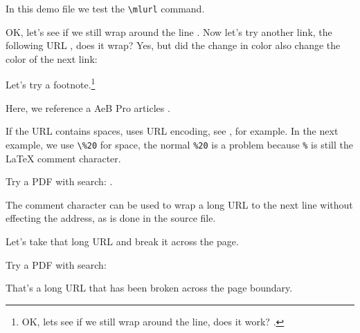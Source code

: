 \documentclass{article}
\begin{document}
In this demo file we test the \verb~\mlurl~ command.

OK, let's see if we still wrap around the line
. Now let's try another link, the following URL
, does it wrap? Yes,
but did the change in color also change the color of the next link: 

Let's try a footnote.\footnote{OK, lets see if we still wrap around the line, does it work?
.}

Here, we reference a \textsf{AeB Pro} articles .

If the URL contains spaces, uses URL encoding, see , for example.
In the next example, we use \verb~\%20~ for space, the normal \texttt{\%20} is a problem because \texttt{\%}
is still the {\LaTeX} comment character.

Try a PDF with search: .

The comment character can be used to wrap a long URL to the next line without effecting the address,
as is done in the source file.

Let's take that long URL and break it across the page.

\vspace{23\baselineskip}



Try a PDF with search: 

That's a long URL that has been broken across the page boundary.
\end{document}
